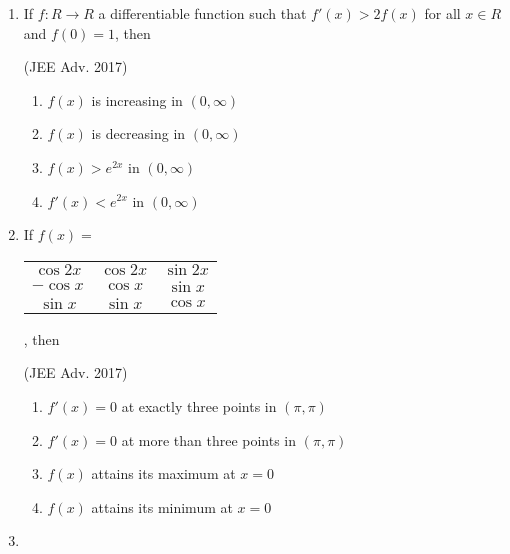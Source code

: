 \documentclass[journal,12pt,twocolumn]{IEEEtran}
\theoremstyle{remark}
\begin{document}
\begin{enumerate}[start = 7]
{        }
    \item{
        
            If $f: R\rightarrow R$ a differentiable function such that $f'(x)>2f(x)$ for all $x \in R$ and $f(0) = 1$, then
            \begin{flushright}
                {(JEE Adv. 2017)}
            \end{flushright}
            \begin{enumerate}
                \item $f(x)$ is increasing in $(0,\infty)$
                \item $f(x)$ is decreasing in $(0,\infty)$
                \item $f(x)>e^{2x}$ in $(0,\infty)$
                \item $f'(x)<e^{2x}$ in $(0,\infty)$
            \end{enumerate}
        
        }
    \item{
        
            If $f(x) = $
            \begin{tabular}{|c c c|} 
    
               $\cos 2x$& $\cos 2x$ & $\sin 2x$ \\ 
    
               $- \cos x$& $\cos x$ & $\sin x$\\ 
    
               $\sin x$ & $\sin x$ & $\cos x$\\ 
    
            \end{tabular} 
            , then
            \begin{flushright}
                {(JEE Adv. 2017)}
            \end{flushright}
            \begin{enumerate}
                \item $f'(x) = 0$ at exactly three points in $(\pi,\pi)$
                \item $f'(x) = 0$ at more than three points in $(\pi,\pi)$
                \item $f(x)$ attains its maximum at $x=0$
                \item $f(x)$ attains its minimum at $x=0$
            \end{enumerate}
        
        }
    \item{
        
}
\end{enumerate}
\end{document}
